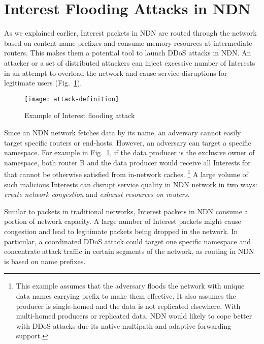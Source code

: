 \section{Interest Flooding Attacks in NDN}
\label{sec:interest-flooding}



As we explained earlier, Interest packets in NDN are routed through the network based on content name prefixes and consume memory resources at intermediate routers. This makes them a potential tool to launch DDoS attacks in NDN. An attacker or a set of distributed attackers can inject excessive number of Interests in an attempt to overload the network and cause service disruptions for legitimate users (Fig.~\ref{fig:flooding example}). 

\begin{figure}[t]
  \centering
  \texttt{[image: attack-definition]}
  \caption{Example of Interest flooding attack}
  \label{fig:flooding example}
  \vspace{-0.3cm}
\end{figure}


Since an NDN network fetches data by its name, an adversary cannot easily target specific routers or end-hosts.
However, an adversary can target a specific namespace.
For example in Fig.~\ref{fig:flooding example}, if the data producer is the exclusive owner of  namespace, both router B and the data producer would receive all Interests for  that cannot be otherwise satisfied from in-network caches.%
\footnote {This example assumes that the adversary floods the network with unique data names carrying  prefix to make them effective. It also assumes the producer is single-homed and the data is not replicated elsewhere. With multi-homed producers or replicated data, NDN would likely to cope better with DDoS attacks due its native multipath and adaptive forwarding~\cite{adaptive-forwarding, Yi:2013:A-Case-for-Stateful} support.}
A large volume of such malicious Interests can disrupt service quality in NDN network in two ways: \emph{create network congestion} and \emph{exhaust resources on routers}.

Similar to packets in traditional networks, Interest packets in NDN consume a portion of network capacity. A large number of Interest packets might cause congestion and lead to legitimate packets being dropped in the network. In particular, a coordinated DDoS attack could target one specific namespace and concentrate attack traffic in certain segments of the network, as routing in NDN is based on name prefixes. 


